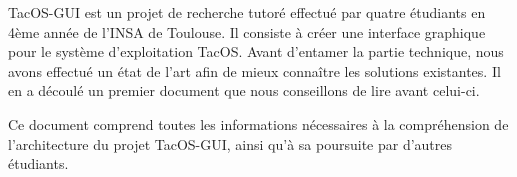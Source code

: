 TacOS-GUI est un projet de recherche tutoré effectué par quatre étudiants en 4ème année de l'INSA de Toulouse.
Il consiste à créer une interface graphique pour le système d'exploitation TacOS.
Avant d'entamer la partie technique, nous avons effectué un état de l'art afin de mieux connaître les solutions existantes. Il en a découlé un premier document que nous conseillons de lire avant celui-ci.

Ce document comprend toutes les informations nécessaires à la compréhension de l'architecture du projet TacOS-GUI, ainsi qu'à sa poursuite par d'autres étudiants.
